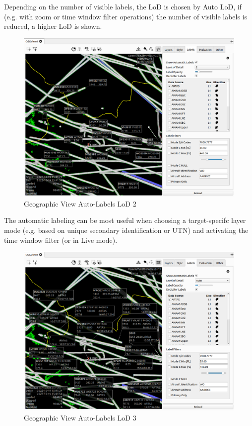 Depending on the number of visible labels, the LoD is chosen by Auto LoD, if (e.g. with zoom or time window filter operations) the number of visible labels is reduced, a higher LoD is shown.

\begin{figure}[H]
    \hspace*{-2.5cm}
    \includegraphics[width=19cm,frame]{figures/geoview_label_lod2.png}
  \caption{Geographic View Auto-Labels LoD 2}
\end{figure}

The automatic labeling can be most useful when choosing a target-specifc layer mode (e.g. based on unique secondary identification or UTN) and activating the time window filter (or in Live mode).

\begin{figure}[H]
    \hspace*{-2.5cm}
    \includegraphics[width=19cm,frame]{figures/geoview_label_lod3.png}
  \caption{Geographic View Auto-Labels LoD 3}
\end{figure}


